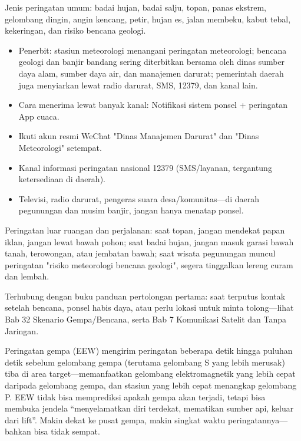 Jenis peringatan umum: badai hujan, badai salju, topan, panas ekstrem, gelombang dingin, angin kencang, petir, hujan es, jalan membeku, kabut tebal, kekeringan, dan risiko bencana geologi.


\begin{itemize}
  \item Penerbit: stasiun meteorologi menangani peringatan meteorologi; bencana geologi dan banjir bandang sering diterbitkan bersama oleh dinas sumber daya alam, sumber daya air, dan manajemen darurat; pemerintah daerah juga menyiarkan lewat radio darurat, SMS, 12379, dan kanal lain.
  \item Cara menerima lewat banyak kanal: Notifikasi sistem ponsel + peringatan App cuaca.
  \item Ikuti akun resmi WeChat "Dinas Manajemen Darurat" dan "Dinas Meteorologi" setempat.
  \item Kanal informasi peringatan nasional 12379 (SMS/layanan, tergantung ketersediaan di daerah).
  \item Televisi, radio darurat, pengeras suara desa/komunitas—di daerah pegunungan dan musim banjir, jangan hanya menatap ponsel.
\end{itemize}

Peringatan luar ruangan dan perjalanan: saat topan, jangan mendekat papan iklan, jangan lewat bawah pohon; saat badai hujan, jangan masuk garasi bawah tanah, terowongan, atau jembatan bawah; saat wisata pegunungan muncul peringatan "risiko meteorologi bencana geologi", segera tinggalkan lereng curam dan lembah.

Terhubung dengan buku panduan pertolongan pertama: saat terputus kontak setelah bencana, ponsel habis daya, atau perlu lokasi untuk minta tolong—lihat Bab 32 Skenario Gempa/Bencana, serta Bab 7 Komunikasi Satelit dan Tanpa Jaringan.


Peringatan gempa (EEW) mengirim peringatan beberapa detik hingga puluhan detik sebelum gelombang gempa (terutama gelombang S yang lebih merusak) tiba di area target—memanfaatkan gelombang elektromagnetik yang lebih cepat daripada gelombang gempa, dan stasiun yang lebih cepat menangkap gelombang P. EEW tidak bisa memprediksi apakah gempa akan terjadi, tetapi bisa membuka jendela “menyelamatkan diri terdekat, mematikan sumber api, keluar dari lift”. Makin dekat ke pusat gempa, makin singkat waktu peringatannya—bahkan bisa tidak sempat.

